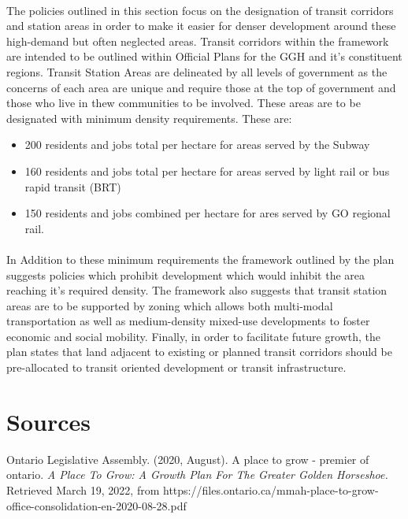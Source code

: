 \documentclass[12pt]{book}
\begin{document}
\paragraph*{}
The policies outlined in this section focus on the designation of transit corridors and station areas in order to make it easier for 
denser development around these high-demand but often neglected areas. Transit corridors within the framework are intended to be outlined
within Official Plans for the GGH and it's constituent regions. Transit Station Areas are delineated by all levels of government as the
concerns of each area are unique and require those at the top of government and those who live in thew communities to be involved. These areas
are to be designated with minimum density requirements. These are:
\begin{itemize}
        \item 200 residents and jobs total per hectare for areas served by the Subway
        \item 160 residents and jobs total per hectare for areas served by light rail or bus rapid transit (BRT)
        \item 150 residents and jobs combined per hectare for ares served by GO regional rail.
\end{itemize}

\paragraph*{}
In Addition to these minimum requirements the framework outlined by the plan suggests policies which prohibit development which
would inhibit the area reaching it's required density. The framework also suggests that transit station areas are to be supported by
zoning which allows both multi-modal transportation as well as medium-density mixed-use developments to foster economic and
social mobility. Finally, in order to facilitate future growth, the plan states that land adjacent to existing or planned transit corridors 
should be pre-allocated to transit oriented development or transit infrastructure.

\section*{Sources}
Ontario Legislative Assembly. (2020, August). A place to grow - premier of ontario. \textit{A Place To Grow: A Growth Plan For The Greater Golden Horseshoe.} Retrieved March 19, 2022, from https://files.ontario.ca/mmah-place-to-grow-office-consolidation-en-2020-08-28.pdf
\end{document}
